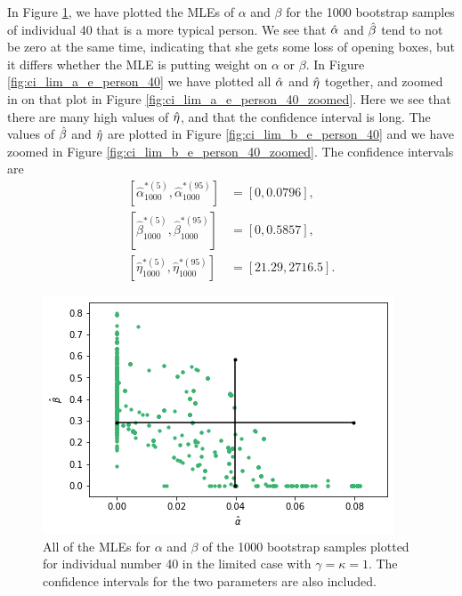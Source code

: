In Figure \ref{fig:ci_lim_a_b_person40}, we have plotted the MLEs of $\alpha$ and $\beta$ for the 1000 bootstrap samples of individual 40 that is a more typical person. We see that $\hat{\alpha}$ and $\hat{\beta}$ tend to not be zero at the same time, indicating that she gets some loss of opening boxes, but it differs whether the MLE is putting weight on $\alpha$ or $\beta$. In Figure \ref{fig:ci_lim_a_e_person_40} we have plotted all $\hat{\alpha}$ and $\hat{\eta}$ together, and zoomed in on that plot in Figure \ref{fig:ci_lim_a_e_person_40_zoomed}. Here we see that there are many high values of $\hat{\eta}$, and that the confidence interval is long. The values of $\hat{\beta}$ and $\hat{\eta}$ are plotted in Figure \ref{fig:ci_lim_b_e_person_40} and we have zoomed in Figure \ref{fig:ci_lim_b_e_person_40_zoomed}. 
The confidence intervals are 
\begin{equation*}
    \begin{aligned}
         \left[ \hat{\alpha}^{*(5)}_{1000},\hat{\alpha}^{*(95)}_{1000}\right] &= [0,0.0796],\\
         \left[\hat{\beta}^{*(5)}_{1000},\hat{\beta}^{*(95)}_{1000}\right] &= [0,0.5857],\\
         \left[\hat{\eta}^{*(5)}_{1000},\hat{\eta}^{*(95)}_{1000}\right] &= [21.29,2716.5].
    \end{aligned}
\end{equation*}
\begin{figure}
    \centering
    \includegraphics[scale=0.5]{pictures/ci_lim_a_b_person40.png}
    \caption[MLEs for $\alpha$ and $\beta$ for bootstrap samples individual 40, limited]{All of the MLEs for $\alpha$ and $\beta$ of the 1000 bootstrap samples plotted for individual number 40 in the limited case with $\gamma=\kappa=1$. The confidence intervals for the two parameters are also included.}
    \label{fig:ci_lim_a_b_person40}
\end{figure}
